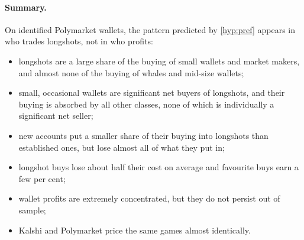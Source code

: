 \paragraph{Summary.}
On identified Polymarket wallets, the pattern predicted by \cref{hyp:pref} appears in who trades longshots, not
in who profits:
\begin{itemize}
  \item longshots are a large share of the buying of small wallets and market makers, and almost none of the
    buying of whales and mid-size wallets;
  \item small, occasional wallets are significant net buyers of longshots, and their buying is absorbed by
    all other classes, none of which is individually a significant net seller;
  \item new accounts put a smaller share of their buying into longshots than established ones, but lose
    almost all of what they put in;
  \item longshot buys lose about half their cost on average and favourite buys earn a few per cent;
  \item wallet profits are extremely concentrated, but they do not persist out of sample;
  \item Kalshi and Polymarket price the same games almost identically.
\end{itemize}
